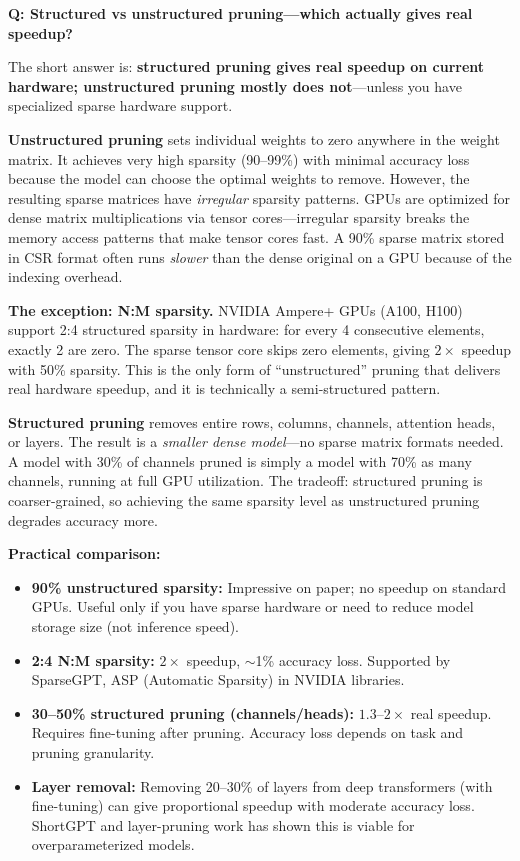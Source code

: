 \begin{interviewq}
\textbf{Q: Structured vs unstructured pruning---which actually gives real speedup?}

 \quad {} \quad \badgefreq{\freqmed}

\stronganswer

The short answer is: \textbf{structured pruning gives real speedup on current hardware; unstructured pruning mostly does not}---unless you have specialized sparse hardware support.

\textbf{Unstructured pruning} sets individual weights to zero anywhere in the weight matrix. It achieves very high sparsity (90--99\%) with minimal accuracy loss because the model can choose the optimal weights to remove. However, the resulting sparse matrices have \textit{irregular} sparsity patterns. GPUs are optimized for dense matrix multiplications via tensor cores---irregular sparsity breaks the memory access patterns that make tensor cores fast. A 90\% sparse matrix stored in CSR format often runs \textit{slower} than the dense original on a GPU because of the indexing overhead.

\textbf{The exception: N:M sparsity.} NVIDIA Ampere+ GPUs (A100, H100) support 2:4 structured sparsity in hardware: for every 4 consecutive elements, exactly 2 are zero. The sparse tensor core skips zero elements, giving $2\times$ speedup with 50\% sparsity. This is the only form of ``unstructured'' pruning that delivers real hardware speedup, and it is technically a semi-structured pattern.

\textbf{Structured pruning} removes entire rows, columns, channels, attention heads, or layers. The result is a \textit{smaller dense model}---no sparse matrix formats needed. A model with 30\% of channels pruned is simply a model with 70\% as many channels, running at full GPU utilization. The tradeoff: structured pruning is coarser-grained, so achieving the same sparsity level as unstructured pruning degrades accuracy more.

\textbf{Practical comparison:}
\begin{itemize}
    \item \textbf{90\% unstructured sparsity:} Impressive on paper; no speedup on standard GPUs. Useful only if you have sparse hardware or need to reduce model storage size (not inference speed).
    \item \textbf{2:4 N:M sparsity:} $2\times$ speedup, $\sim$1\% accuracy loss. Supported by SparseGPT, ASP (Automatic Sparsity) in NVIDIA libraries.
    \item \textbf{30--50\% structured pruning (channels/heads):} $1.3$--$2\times$ real speedup. Requires fine-tuning after pruning. Accuracy loss depends on task and pruning granularity.
    \item \textbf{Layer removal:} Removing 20--30\% of layers from deep transformers (with fine-tuning) can give proportional speedup with moderate accuracy loss. ShortGPT and layer-pruning work has shown this is viable for overparameterized models.
\end{itemize}


\end{interviewq}
